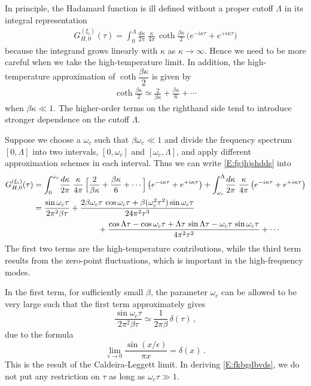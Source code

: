 \documentclass[11pt,a4paper]{article}
\begin{document}
In principle, the Hadamard function is ill defined without a proper cutoff $\Lambda$ in its integral representation
\begin{align}\label{E:fgjhjshdds}
	G_{H,0}^{(\xi_{i})}(\tau)=\int_{0}^{\Lambda}\!\frac{d\kappa}{2\pi}\;\frac{\kappa}{4\pi}\,\coth\frac{\beta\kappa}{2}\,\bigl(e^{-i\kappa\tau}+e^{+i\kappa\tau}\bigr)
\end{align}
because the integrand grows linearly with $\kappa$ as $\kappa\to\infty$. Hence we need to be more careful when we take the high-temperature limit. In addition, the high-temperature approximation of $\coth\dfrac{\beta\kappa}{2}$ is given by
\begin{align}
	\coth\frac{\beta\kappa}{2}\simeq\frac{2}{\beta\kappa}+\frac{\beta\kappa}{6}+\cdots\label{E:uiweesbf}
\end{align}
when $\beta\kappa\ll1$. The higher-order terms on the righthand side tend to introduce stronger dependence on the cutoff $\Lambda$.


Suppose we choose a $\omega_{c}$ such that $\beta\omega_{c}\ll1$ and divide the frequency spectrum $[0,\Lambda]$ into two intervals, $[0,\omega_{c}]$ and $[\omega_{c},\Lambda]$, and apply different approximation schemes {in each interval}. Thus we can write \eqref{E:fgjhjshdds} into
\begin{align}\label{E:qzjshdf}
	G_{H,0}^{(\xi_{i})}(\tau)&=\int_{0}^{\omega_{c}}\!\frac{d\kappa}{2\pi}\;\frac{\kappa}{4\pi}\,\Bigl[\frac{2}{\beta\kappa}+\frac{\beta\kappa}{6}+\cdots\Bigr]\,\bigl(e^{-i\kappa\tau}+e^{+i\kappa\tau}\bigr)+\int_{\omega_{c}}^{\Lambda}\!\frac{d\kappa}{2\pi}\;\frac{\kappa}{4\pi}\,\bigl(e^{-i\kappa\tau}+e^{+i\kappa\tau}\bigr)\notag\\
	&=\frac{\sin\omega_{c}\tau}{2\pi^{2}\beta\tau}+\frac{2\beta\omega_{c}\tau\,\cos\omega_{c}\tau+\beta(\omega_{c}^{2}\tau^{2})\sin\omega_{c}\tau}{24\pi^{2}\tau^{3}}\notag\\
 &\qquad\qquad\qquad\qquad+\frac{\cos\Lambda\tau-\cos\omega_{c}\tau+\Lambda\tau\,\sin\Lambda\tau-\omega_{c}\tau\,\sin\omega_{c}\tau}{4\pi^{2}\tau^{2}}+\cdots
\end{align}
The first two terms are the high-temperature contributions, while the third term results from the zero-point fluctuations, which is important in the high-frequency modes. 

 
In the first term, for sufficiently small $\beta$, the parameter $\omega_{c}$ can be allowed to be very large such that the first term approximately gives
\begin{equation}\label{E:fkbgdbvds}
	\frac{\sin\omega_{c}\tau}{2\pi^{2}\beta\tau}\simeq\frac{1}{2\pi\beta}\,\delta(\tau)\,,
\end{equation}
due to the formula
\begin{equation}
	\lim_{\epsilon\to0}\frac{\sin(x/\epsilon)}{\pi x}=\delta(x)\,.
\end{equation}
This is the result of the Caldeira-Leggett limit. In deriving \eqref{E:fkbgdbvds}, we do not put any restriction on $\tau$ as long as $\omega_c\tau\gg1$. 
\end{document}
